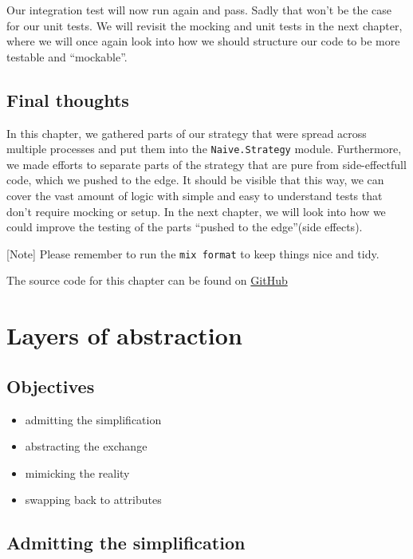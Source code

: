 \documentclass[
  oneside]{book}
\providecommand{\tightlist}{%
  \setlength{\itemsep}{0pt}\setlength{\parskip}{0pt}}
\begin{document}
Our integration test will now run again and pass. Sadly that won't be the case for our unit tests. We will revisit the mocking and unit tests in the next chapter, where we will once again look into how we should structure our code to be more testable and ``mockable''.

\section{Final thoughts}\label{final-thoughts-1}

In this chapter, we gathered parts of our strategy that were spread across multiple processes and put them into the \texttt{Naive.Strategy} module. Furthermore, we made efforts to separate parts of the strategy that are pure from side-effectfull code, which we pushed to the edge. It should be visible that this way, we can cover the vast amount of logic with simple and easy to understand tests that don't require mocking or setup. In the next chapter, we will look into how we could improve the testing of the parts ``pushed to the edge''(side effects).

{[}Note{]} Please remember to run the \texttt{mix\ format} to keep things nice and tidy.

The source code for this chapter can be found on \href{https://github.com/Cinderella-Man/hands-on-elixir-and-otp-cryptocurrency-trading-bot-source-code/tree/chapter_20}{GitHub}

\chapter{Layers of abstraction}\label{layers-of-abstraction}

\section{Objectives}\label{objectives-20}

\begin{itemize}
\tightlist
\item
  admitting the simplification
\item
  abstracting the exchange
\item
  mimicking the reality
\item
  swapping back to attributes
\end{itemize}

\section{Admitting the simplification}\label{admitting-the-simplification}
\end{document}

